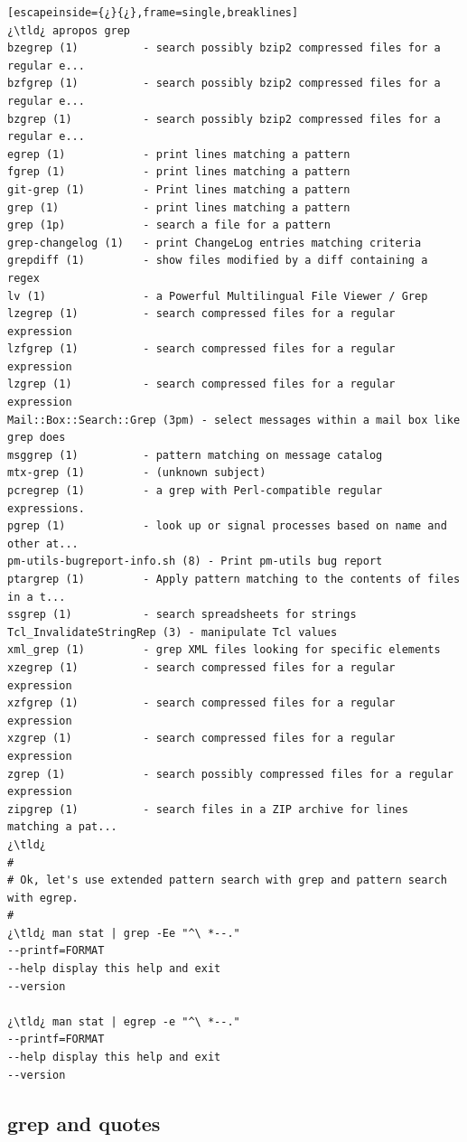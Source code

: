 \begin{lstlisting}[escapeinside={¿}{¿},frame=single,breaklines]
¿\tld¿ apropos grep
bzegrep (1)          - search possibly bzip2 compressed files for a regular e...
bzfgrep (1)          - search possibly bzip2 compressed files for a regular e...
bzgrep (1)           - search possibly bzip2 compressed files for a regular e...
egrep (1)            - print lines matching a pattern
fgrep (1)            - print lines matching a pattern
git-grep (1)         - Print lines matching a pattern
grep (1)             - print lines matching a pattern
grep (1p)            - search a file for a pattern
grep-changelog (1)   - print ChangeLog entries matching criteria
grepdiff (1)         - show files modified by a diff containing a regex
lv (1)               - a Powerful Multilingual File Viewer / Grep
lzegrep (1)          - search compressed files for a regular expression
lzfgrep (1)          - search compressed files for a regular expression
lzgrep (1)           - search compressed files for a regular expression
Mail::Box::Search::Grep (3pm) - select messages within a mail box like grep does
msggrep (1)          - pattern matching on message catalog
mtx-grep (1)         - (unknown subject)
pcregrep (1)         - a grep with Perl-compatible regular expressions.
pgrep (1)            - look up or signal processes based on name and other at...
pm-utils-bugreport-info.sh (8) - Print pm-utils bug report
ptargrep (1)         - Apply pattern matching to the contents of files in a t...
ssgrep (1)           - search spreadsheets for strings
Tcl_InvalidateStringRep (3) - manipulate Tcl values
xml_grep (1)         - grep XML files looking for specific elements
xzegrep (1)          - search compressed files for a regular expression
xzfgrep (1)          - search compressed files for a regular expression
xzgrep (1)           - search compressed files for a regular expression
zgrep (1)            - search possibly compressed files for a regular expression
zipgrep (1)          - search files in a ZIP archive for lines matching a pat...
¿\tld¿ 
#
# Ok, let's use extended pattern search with grep and pattern search with egrep.
#
¿\tld¿ man stat | grep -Ee "^\ *--."
--printf=FORMAT
--help display this help and exit
--version

¿\tld¿ man stat | egrep -e "^\ *--."
--printf=FORMAT
--help display this help and exit
--version

\end{lstlisting}

\subsection{grep and quotes}

